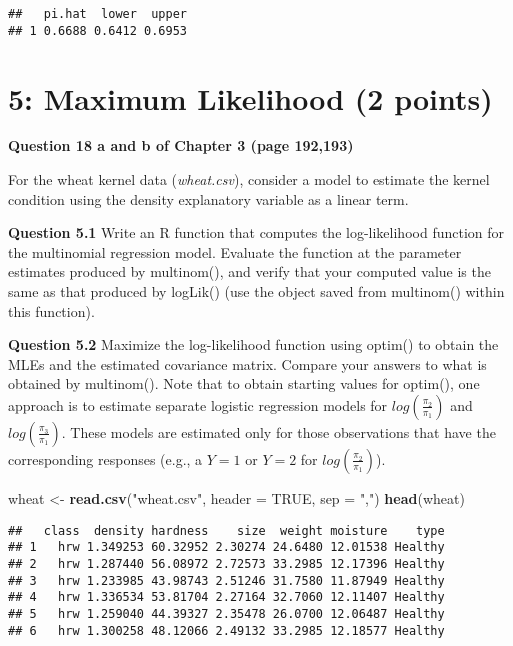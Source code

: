 \documentclass[]{article}
\newenvironment{Shaded}{\begin{snugshade}}{\end{snugshade}}
\newcommand{\DataTypeTok}[1]{\textcolor[rgb]{0.13,0.29,0.53}{#1}}
\newcommand{\KeywordTok}[1]{\textcolor[rgb]{0.13,0.29,0.53}{\textbf{#1}}}
\newcommand{\NormalTok}[1]{#1}
\newcommand{\OtherTok}[1]{\textcolor[rgb]{0.56,0.35,0.01}{#1}}
\newcommand{\StringTok}[1]{\textcolor[rgb]{0.31,0.60,0.02}{#1}}
\begin{document}
\begin{verbatim}
##   pi.hat  lower  upper
## 1 0.6688 0.6412 0.6953
\end{verbatim}

\newpage

\hypertarget{maximum-likelihood-2-points}{%
\section{5: Maximum Likelihood (2
points)}\label{maximum-likelihood-2-points}}

\textbf{Question 18 a and b of Chapter 3 (page 192,193)}

For the wheat kernel data (\emph{wheat.csv}), consider a model to
estimate the kernel condition using the density explanatory variable as
a linear term.

\textbf{Question 5.1} Write an R function that computes the
log-likelihood function for the multinomial regression model. Evaluate
the function at the parameter estimates produced by multinom(), and
verify that your computed value is the same as that produced by logLik()
(use the object saved from multinom() within this function).

\textbf{Question 5.2} Maximize the log-likelihood function using optim()
to obtain the MLEs and the estimated covariance matrix. Compare your
answers to what is obtained by multinom(). Note that to obtain starting
values for optim(), one approach is to estimate separate logistic
regression models for \(log \left( \frac{\pi_2}{\pi_1} \right)\) and
\(log \left( \frac{\pi_3}{\pi_1} \right)\). These models are estimated
only for those observations that have the corresponding responses (e.g.,
a \(Y = 1\) or \(Y = 2\) for
\(log \left( \frac{\pi_2}{\pi_1} \right)\)).

\begin{Shaded}
\begin{Highlighting}[]
\NormalTok{wheat <-}\StringTok{ }\KeywordTok{read.csv}\NormalTok{(}\StringTok{"wheat.csv"}\NormalTok{, }\DataTypeTok{header =} \OtherTok{TRUE}\NormalTok{, }\DataTypeTok{sep =} \StringTok{","}\NormalTok{)}
\KeywordTok{head}\NormalTok{(wheat)}
\end{Highlighting}
\end{Shaded}

\begin{verbatim}
##   class  density hardness    size  weight moisture    type
## 1   hrw 1.349253 60.32952 2.30274 24.6480 12.01538 Healthy
## 2   hrw 1.287440 56.08972 2.72573 33.2985 12.17396 Healthy
## 3   hrw 1.233985 43.98743 2.51246 31.7580 11.87949 Healthy
## 4   hrw 1.336534 53.81704 2.27164 32.7060 12.11407 Healthy
## 5   hrw 1.259040 44.39327 2.35478 26.0700 12.06487 Healthy
## 6   hrw 1.300258 48.12066 2.49132 33.2985 12.18577 Healthy
\end{verbatim}
\end{document}
